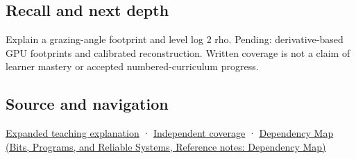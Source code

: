 \subsection{Recall and next depth}\label{appendix-b677a85ba76f-recall-and-next-depth}

Explain a grazing-angle footprint and level log 2 rho. Pending: derivative-based GPU footprints and calibrated reconstruction. Written coverage is not a claim of learner mastery or accepted numbered-curriculum progress.

\subsection{Source and navigation}\label{appendix-b677a85ba76f-source-and-navigation}

\hyperref[04-visual-computing-ii-ch042-multiresolution-work-must-preserve-the-right-information]{Expanded teaching explanation} · \hyperref[appendix-fd090d982a15-xr01---independent-seeing-and-representation-source]{Independent coverage} · \href{../01-Bits-Programs-and-Reliable-Systems/main.pdf\#nameddest=appendix-4ad47bdd269a}{Dependency Map (Bits, Programs, and Reliable Systems, Reference notes: Dependency Map)}
